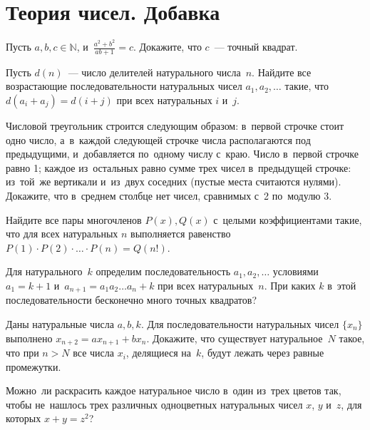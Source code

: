 
\section*{Теория чисел. Добавка}


\begin{problems}

\item
Пусть $a, b, c \in \mathbb{N}$, и~$\frac{a^2 + b^2}{a b + 1} = c$.
Докажите, что $c$~--- точный квадрат.

\item
Пусть $d(n)$~--- число делителей натурального числа~$n$.
Найдите все возрастающие последовательности натуральных чисел
$a_1, a_2, \ldots$ такие, что $d(a_i + a_j) = d(i + j)$ при всех натуральных
$i$ и~$j$.

\item
Числовой треугольник строится следующим образом: в~первой строчке стоит одно
число, а~в~каждой следующей строчке числа располагаются под предыдущими,
и~добавляется по~одному числу с~краю.
Число в~первой строчке равно 1;
каждое из~остальных равно сумме трех чисел в~предыдущей строчке:
из~той~же вертикали и~из~двух соседних (пустые места считаются нулями).
Докажите, что в~среднем столбце нет чисел, сравнимых с~2 по~модулю 3.

\item
Найдите все пары многочленов $P(x), Q(x)$ с~целыми коэффициентами такие, что
для всех натуральных $n$ выполняется равенство
\(
    P(1) \cdot P(2) \cdot \ldots \cdot P(n)
=
    Q(n!)
\).

\item
Для натурального~$k$ определим последовательность $a_1, a_2, \ldots$ условиями
$a_1 = k + 1$ и~$a_{n+1} = a_1 a_2 \ldots a_n + k$ при всех натуральных~$n$.
При каких $k$ в~этой последовательности бесконечно много точных квадратов?

\item
Даны натуральные числа $a, b, k$.
Для последовательности натуральных чисел $\{ x_n \}$ выполнено
$x_{n+2} = a x_{n+1} + b x_{n}$.
Докажите, что существует натуральное~$N$ такое, что при $n > N$ все
числа $x_i$, делящиеся на~$k$, будут лежать через равные промежутки.

\item
Можно~ли раскрасить каждое натуральное число в~один из~трех цветов так, чтобы
не~нашлось трех различных одноцветных натуральных чисел $x$, $y$ и~$z$, для
которых $x + y = z^2$?

\end{problems}

